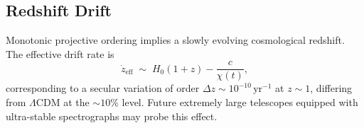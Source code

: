 \subsection{Redshift Drift}
  \label{subsec:redshift-drift}

  Monotonic projective ordering implies a slowly evolving cosmological
  redshift.
  The effective drift rate is
  \begin{equation}
    \dot{z}_{\mathrm{eff}}
    \;\sim\;
    H_0 (1+z) - \frac{c}{\chi(t)},
  \end{equation}
  corresponding to a secular variation of order
  $\Delta z \sim 10^{-10}\,\mathrm{yr}^{-1}$ at $z \sim 1$, differing
  from $\Lambda$CDM at the $\sim 10\%$ level.
  Future extremely large telescopes equipped with ultra-stable
  spectrographs may probe this effect.
